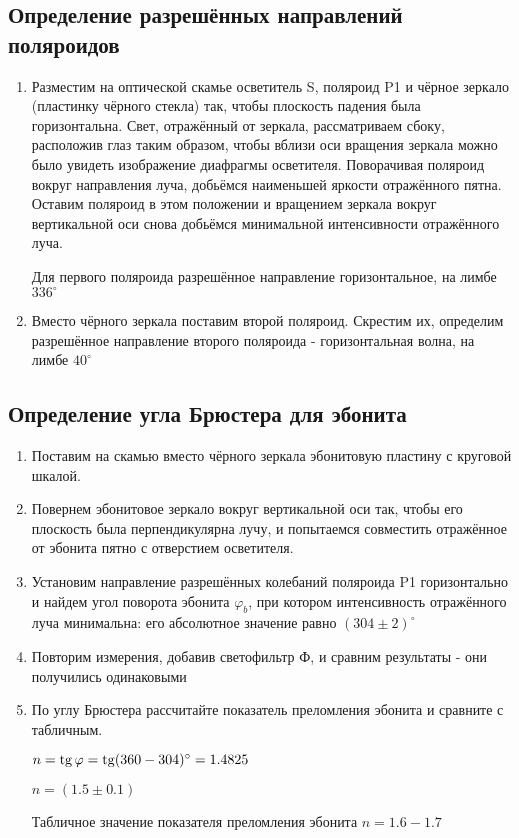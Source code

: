 \subsection{Определение разрешённых направлений поляроидов}
\begin{enumerate}
    \item Разместим на оптической скамье осветитель
S, поляроид P1 и чёрное зеркало (пластинку чёрного стекла) так, чтобы плоскость падения была горизонтальна. Свет, отражённый от зеркала, рассматриваем сбоку, расположив глаз таким образом, чтобы вблизи оси вращения зеркала можно было увидеть изображение диафрагмы осветителя.
Поворачивая поляроид вокруг направления луча, добьёмся наименьшей яркости отражённого пятна. Оставим поляроид в этом положении
и вращением зеркала вокруг вертикальной оси снова добьёмся минимальной интенсивности отражённого луча.
\begin{figure}[h!]
	  \center{\texttt{[image: 5]}}
\end{figure}
\par Для первого поляроида разрешённое направление горизонтальное, на лимбе $336^{\circ}$
\item Вместо чёрного зеркала поставим второй поляроид. Скрестим их, определим разрешённое направление второго поляроида - горизонтальная волна, на лимбе $40^{\circ}$
\end{enumerate}

\subsection{Определение угла Брюстера для эбонита}
\begin{enumerate}
\item Поставим на скамью вместо чёрного зеркала эбонитовую пластину с круговой шкалой.

\item  Повернем эбонитовое зеркало вокруг вертикальной оси так, чтобы его
плоскость была перпендикулярна лучу, и попытаемся совместить отражённое от эбонита пятно с отверстием осветителя.

\item Установим направление разрешённых
колебаний поляроида P1 горизонтально и найдем угол поворота эбонита
$\varphi_b$, при котором интенсивность
отражённого луча минимальна: его абсолютное значение равно $(304 \pm 2)^{\circ}$

\item Повторим измерения, добавив светофильтр Ф, и сравним результаты - они получились одинаковыми

\item По углу Брюстера рассчитайте показатель преломления эбонита и сравните с табличным.
\begin{center}
    $n = \mathop{\mathrm{tg}}\nolimits \varphi = \mathop{\mathrm{tg}}\nolimits (360-304)^{\circ} = 1.4825$
\end{center}
\begin{center}
    $n = (1.5 \pm 0.1)$
\end{center}
Табличное значение показателя преломления эбонита $n = 1.6 - 1.7$

\end{enumerate}

